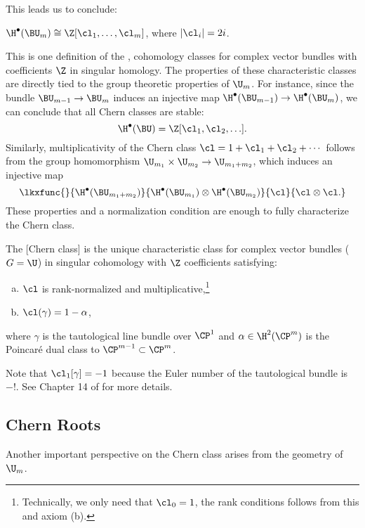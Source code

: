 This leads us to conclude:
\begin{proposition}
	$\H^\bullet(\BU_m)\cong \Z[\cl_1,\ldots, \cl_m]$, where $|\cl_i|=2i$.
\end{proposition}

This is one definition of the , cohomology classes for complex vector bundles with coefficients $\Z$ in singular homology. The properties of these characteristic classes are directly tied to the group theoretic properties of $\U_m$.
For instance, since the bundle $\BU_{m-1} \to \BU_{m}$ induces an injective map $\H^\bullet(\BU_{m-1}) \to \H^\bullet(\BU_m)$, we can conclude that all Chern classes are stable:
\[
	\H^\bullet(\BU) = \Z[\cl_1,\cl_2,\ldots].
\]
Similarly, multiplicativity of the Chern class $\cl = 1+\cl_1+\cl_2+\cdots$ follows from the group homomorphism $\U_{m_1}\times \U_{m_2} \to \U_{m_1+m_2}$, which induces an injective map 
\[
	\lkxfunc{}{\H^\bullet(\BU_{m_1+m_2})}{\H^\bullet(\BU_{m_1})\otimes \H^\bullet(\BU_{m_2})}{\cl}{\cl \otimes \cl.}
\]
These properties and a normalization condition are enough to fully characterize the Chern class.
\begin{proposition}
	The [Chern class] is the unique characteristic class for complex vector bundles ($G=\U$) in singular cohomology with $\Z$ coefficients satisfying:
	\begin{enumerate}[(a)]
		\item $\cl$ is rank-normalized and multiplicative,\footnote{Technically, we only need that $\cl_0=1$, the rank conditions follows from this and axiom (b).}
		\item $\cl(\gamma)=1-\alpha$,
	\end{enumerate}
	where $\gamma$ is the tautological line bundle over $\CP^1$ and $\alpha\in \H^2(\CP^m)$ is the Poincar\'e dual class to $\CP^{m-1}\subset \CP^m$.
\end{proposition}

Note that $\cl_1[\gamma]=-1$ because the Euler number of the tautological bundle is $-!$. See Chapter 14 of \cite{milnorstasheff1974} for more details.


\subsection{Chern Roots}

Another important perspective on the Chern class arises from the geometry of $\U_m$. 

